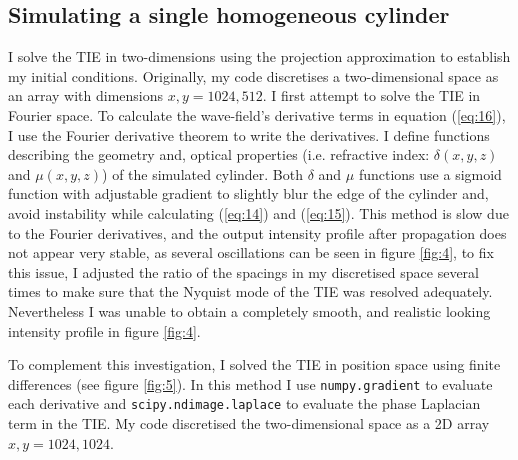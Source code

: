 \documentclass[10pt, a4paper, singlespacing]{report}
\begin{document}
\subsection{Simulating a single homogeneous cylinder}\label{Single cylinder}

I solve the TIE in two-dimensions using the projection approximation to establish my initial conditions.  Originally, my code discretises a two-dimensional space as an array with dimensions $x, y = 1024, 512$. I first attempt to solve the TIE in Fourier space. To calculate the wave-field's derivative terms in equation (\ref{eq:16}), I use the Fourier derivative theorem to write the derivatives. I define functions describing the geometry and, optical properties (i.e. refractive index: $\delta(x, y, z)$ and $\mu(x, y, z)$) of the simulated cylinder. Both $\delta$ and $\mu$ functions use a sigmoid function with adjustable gradient to slightly blur the edge of the cylinder and, avoid instability while calculating (\ref{eq:14}) and (\ref{eq:15}). This method is slow due to the Fourier derivatives, and the output intensity profile after propagation does not appear very stable, as several oscillations can be seen in figure \ref{fig:4}, to fix this issue, I adjusted the ratio of the spacings in my discretised space several times to make sure that the Nyquist mode of the TIE was resolved adequately. Nevertheless I was unable to obtain a completely smooth, and realistic looking intensity profile in figure \ref{fig:4}.

To complement this investigation, I solved the TIE in position space using finite differences (see figure \ref{fig:5}). In this method I use \texttt{numpy.gradient} to evaluate each derivative and \texttt{scipy.ndimage.laplace} to evaluate the phase Laplacian term in the TIE. My code discretised the two-dimensional space as a 2D array $x, y = 1024, 1024$. 
\end{document}
